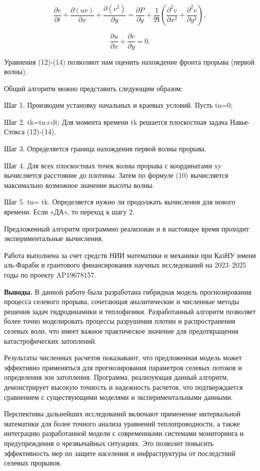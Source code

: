 \begin{equation}
\frac{\partial v}{\partial t} + \frac{\partial(uv)}{\partial x} + \frac{\partial(v^{2})}{\partial y} = \frac{\partial P}{\partial y} + \frac{1}{\Re}\left( \frac{\partial^{2}v}{\partial x^{2}} + \frac{\partial^{2}v}{\partial y^{2}} \right),
\end{equation}

\begin{equation}
\frac{\partial u}{\partial x} + \frac{\partial v}{\partial y} = 0.
\end{equation}

\begin{multicols}{2}
Уравнения (12)-(14) позволяют нам оценить нахождение фронта прорыва
(первой волны).

Общий алгоритм можно представить следующим образом:

Шаг 1. Производим установку начальных и краевых условий. Пусть tn=0;

Шаг 2. tk=tn+dt; Для момента времени tk решается плоскостная задача
Навье-Стокса (12)-(14).

Шаг 3. Определяется граница нахождения первой волны прорыва.

Шаг 4. Для всех плоскостных точек волны прорыва с координатами xy
вычисляется расстояние до плотины. Затем по формуле (10) вычисляется
максимально возможное значение высоты волны.

Шаг 5. tn= tk. Определяется нужно ли продолжать вычисления для нового
времени. Если «ДА», то переход к шагу 2.

Предложенный алгоритм программно реализован и в настоящее время проходит
экспериментальные вычисления.

Работа выполнена за счет средств НИИ математики и механики при КазНУ
имени аль-Фараби и грантового финансирования научных исследований на
2023--2025 годы по проекту AP19678157.

{\bfseries Выводы.} В данной работе была разработана гибридная модель
прогнозирования процесса селевого прорыва, сочетающая аналитические и
численные методы решения задач гидродинамики и теплофизики.
Разработанный алгоритм позволяет более точно моделировать процессы
разрушения плотин и распространения селевых волн, что имеет важное
практическое значение для предотвращения катастрофических затоплений.

Результаты численных расчетов показывают, что предложенная модель может
эффективно применяться для прогнозирования параметров селевых потоков и
определения зон затопления. Программа, реализующая данный алгоритм,
демонстрирует высокую точность и надежность расчетов, что подтверждается
сравнением с существующими моделями и экспериментальными данными.

Перспективы дальнейших исследований включают применение интервальной
математики для более точного анализа уравнений теплопроводности, а также
интеграцию разработанной модели с современными системами мониторинга и
предупреждения о чрезвычайных ситуациях. Это позволит повысить
эффективность мер по защите населения и инфраструктуры от последствий
селевых прорывов.
\end{multicols}

